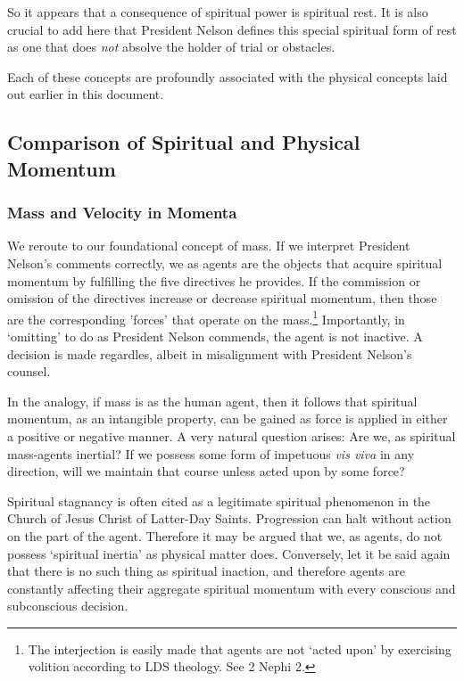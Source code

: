 \documentclass{article}
\begin{document}
            So it appears that a consequence of spiritual power is spiritual rest. It is also crucial to add here that President Nelson defines this special spiritual form of rest as one that does \emph{not} absolve the holder of trial or obstacles. 
            
            Each of these concepts are profoundly associated with the physical concepts laid out earlier in this document.

        \subsection{Comparison of Spiritual and Physical Momentum}
            \subsubsection{Mass and Velocity in Momenta}
                We reroute to our foundational concept of mass. If we interpret President Nelson's comments correctly, we as agents are the objects that acquire spiritual momentum by fulfilling the five directives he provides.
                If the commission or omission of the directives increase or decrease spiritual momentum, then those are the corresponding 'forces' that operate on the mass.\footnote{The interjection is easily made that agents are not `acted upon' by exercising volition according to LDS theology. See 2 Nephi 2.}
                Importantly, in `omitting' to do as President Nelson commends, the agent is not inactive. A decision is made regardles, albeit in misalignment with President Nelson's counsel. 

                In the analogy, if mass is as the human agent, then it follows that spiritual momentum, as an intangible property, can be gained as force is applied in either a positive or negative manner.
                A very natural question arises: Are we, as spiritual mass-agents inertial? If we possess some form of impetuous \textit{vis viva} in any direction, will we maintain that course unless acted upon by some force?
                
                Spiritual stagnancy is often cited as a legitimate spiritual phenomenon in the Church of Jesus Christ of Latter-Day Saints. Progression can halt without action on the part of the agent. Therefore it may be argued that we, as agents, do not possess `spiritual inertia' as physical matter does. 
                Conversely, let it be said again that there is no such thing as spiritual inaction, and therefore agents are constantly affecting their aggregate spiritual momentum with every conscious and subconscious decision.
\end{document}
